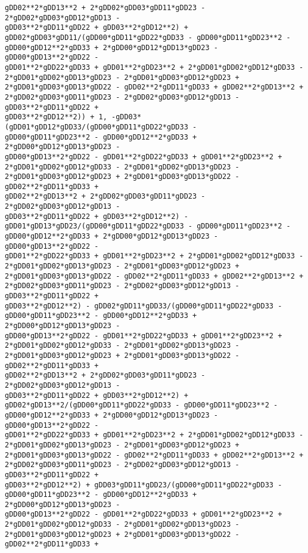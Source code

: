 \documentclass[landscape,letterpaper,10pt,english]{article}
\begin{document}
\begin{Verbatim}[commandchars=\\\{\}]
gDD02**2*gDD13**2 + 2*gDD02*gDD03*gDD11*gDD23 - 2*gDD02*gDD03*gDD12*gDD13 -
gDD03**2*gDD11*gDD22 + gDD03**2*gDD12**2) +
gDD02*gDD03*gDD11/(gDD00*gDD11*gDD22*gDD33 - gDD00*gDD11*gDD23**2 -
gDD00*gDD12**2*gDD33 + 2*gDD00*gDD12*gDD13*gDD23 - gDD00*gDD13**2*gDD22 -
gDD01**2*gDD22*gDD33 + gDD01**2*gDD23**2 + 2*gDD01*gDD02*gDD12*gDD33 -
2*gDD01*gDD02*gDD13*gDD23 - 2*gDD01*gDD03*gDD12*gDD23 +
2*gDD01*gDD03*gDD13*gDD22 - gDD02**2*gDD11*gDD33 + gDD02**2*gDD13**2 +
2*gDD02*gDD03*gDD11*gDD23 - 2*gDD02*gDD03*gDD12*gDD13 - gDD03**2*gDD11*gDD22 +
gDD03**2*gDD12**2)) + 1, -gDD03*(gDD01*gDD12*gDD33/(gDD00*gDD11*gDD22*gDD33 -
gDD00*gDD11*gDD23**2 - gDD00*gDD12**2*gDD33 + 2*gDD00*gDD12*gDD13*gDD23 -
gDD00*gDD13**2*gDD22 - gDD01**2*gDD22*gDD33 + gDD01**2*gDD23**2 +
2*gDD01*gDD02*gDD12*gDD33 - 2*gDD01*gDD02*gDD13*gDD23 -
2*gDD01*gDD03*gDD12*gDD23 + 2*gDD01*gDD03*gDD13*gDD22 - gDD02**2*gDD11*gDD33 +
gDD02**2*gDD13**2 + 2*gDD02*gDD03*gDD11*gDD23 - 2*gDD02*gDD03*gDD12*gDD13 -
gDD03**2*gDD11*gDD22 + gDD03**2*gDD12**2) -
gDD01*gDD13*gDD23/(gDD00*gDD11*gDD22*gDD33 - gDD00*gDD11*gDD23**2 -
gDD00*gDD12**2*gDD33 + 2*gDD00*gDD12*gDD13*gDD23 - gDD00*gDD13**2*gDD22 -
gDD01**2*gDD22*gDD33 + gDD01**2*gDD23**2 + 2*gDD01*gDD02*gDD12*gDD33 -
2*gDD01*gDD02*gDD13*gDD23 - 2*gDD01*gDD03*gDD12*gDD23 +
2*gDD01*gDD03*gDD13*gDD22 - gDD02**2*gDD11*gDD33 + gDD02**2*gDD13**2 +
2*gDD02*gDD03*gDD11*gDD23 - 2*gDD02*gDD03*gDD12*gDD13 - gDD03**2*gDD11*gDD22 +
gDD03**2*gDD12**2) - gDD02*gDD11*gDD33/(gDD00*gDD11*gDD22*gDD33 -
gDD00*gDD11*gDD23**2 - gDD00*gDD12**2*gDD33 + 2*gDD00*gDD12*gDD13*gDD23 -
gDD00*gDD13**2*gDD22 - gDD01**2*gDD22*gDD33 + gDD01**2*gDD23**2 +
2*gDD01*gDD02*gDD12*gDD33 - 2*gDD01*gDD02*gDD13*gDD23 -
2*gDD01*gDD03*gDD12*gDD23 + 2*gDD01*gDD03*gDD13*gDD22 - gDD02**2*gDD11*gDD33 +
gDD02**2*gDD13**2 + 2*gDD02*gDD03*gDD11*gDD23 - 2*gDD02*gDD03*gDD12*gDD13 -
gDD03**2*gDD11*gDD22 + gDD03**2*gDD12**2) +
gDD02*gDD13**2/(gDD00*gDD11*gDD22*gDD33 - gDD00*gDD11*gDD23**2 -
gDD00*gDD12**2*gDD33 + 2*gDD00*gDD12*gDD13*gDD23 - gDD00*gDD13**2*gDD22 -
gDD01**2*gDD22*gDD33 + gDD01**2*gDD23**2 + 2*gDD01*gDD02*gDD12*gDD33 -
2*gDD01*gDD02*gDD13*gDD23 - 2*gDD01*gDD03*gDD12*gDD23 +
2*gDD01*gDD03*gDD13*gDD22 - gDD02**2*gDD11*gDD33 + gDD02**2*gDD13**2 +
2*gDD02*gDD03*gDD11*gDD23 - 2*gDD02*gDD03*gDD12*gDD13 - gDD03**2*gDD11*gDD22 +
gDD03**2*gDD12**2) + gDD03*gDD11*gDD23/(gDD00*gDD11*gDD22*gDD33 -
gDD00*gDD11*gDD23**2 - gDD00*gDD12**2*gDD33 + 2*gDD00*gDD12*gDD13*gDD23 -
gDD00*gDD13**2*gDD22 - gDD01**2*gDD22*gDD33 + gDD01**2*gDD23**2 +
2*gDD01*gDD02*gDD12*gDD33 - 2*gDD01*gDD02*gDD13*gDD23 -
2*gDD01*gDD03*gDD12*gDD23 + 2*gDD01*gDD03*gDD13*gDD22 - gDD02**2*gDD11*gDD33 +

\end{Verbatim}
\end{document}
